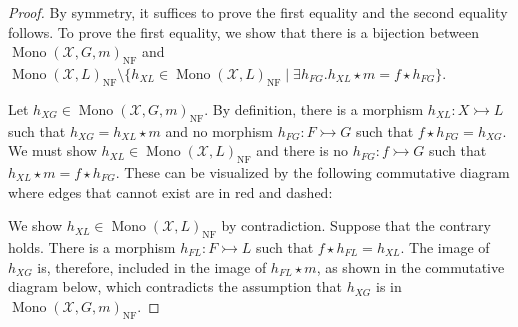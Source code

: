 \begin{proof}
    By symmetry, it suffices to prove the first equality and the second equality follows. To prove the first equality, we show that there is a bijection between $\operatorname{Mono}(\mathcal{X},G,m)_{\operatorname{NF}}$ and $\operatorname{Mono}(\mathcal{X},L)_{\operatorname{NF}} \setminus \{
                h_{XL} \in \operatorname{Mono}(\mathcal{X},L)_{\operatorname{NF}} \mid 
                \exists h_{FG}. h_{XL} \star m = f \star h_{FG}
            \}$.

    Let $h_{XG} \in \operatorname{Mono}(\mathcal{X},G,m)_{\operatorname{NF}}$.  By definition, there is a morphism $h_{XL}: X \rightarrowtail L$ such that $h_{XG} = h_{XL} \star m$ and no morphism $h_{FG}: F \rightarrowtail G$ such that $f \star h_{FG} = h_{XG}$. We must show $h_{XL} \in \operatorname{Mono}(\mathcal{X},L)_{\operatorname{NF}}$ and there is no $h_{FG}:f \rightarrowtail G$ such that $h_{XL} \star m = f \star h_{FG}$. These can be visualized by the following commutative diagram where edges that cannot exist are in red and dashed:

    \begin{center}
    \end{center}
    
    We show $h_{XL} \in \operatorname{Mono}(\mathcal{X},L)_{\operatorname{NF}}$ by contradiction. Suppose that the contrary holds. There is a morphism $h_{FL}: F \rightarrowtail L$ such that $f \star h_{FL} = h_{XL}$.
    The image of $h_{XG}$ is, therefore, included in the image of $h_{FL} \star m$, as shown in the commutative diagram below, which contradicts the assumption that $h_{XG}$ is in $\operatorname{Mono}(\mathcal{X},G,m)_{\operatorname{NF}}$. 


\end{proof}
